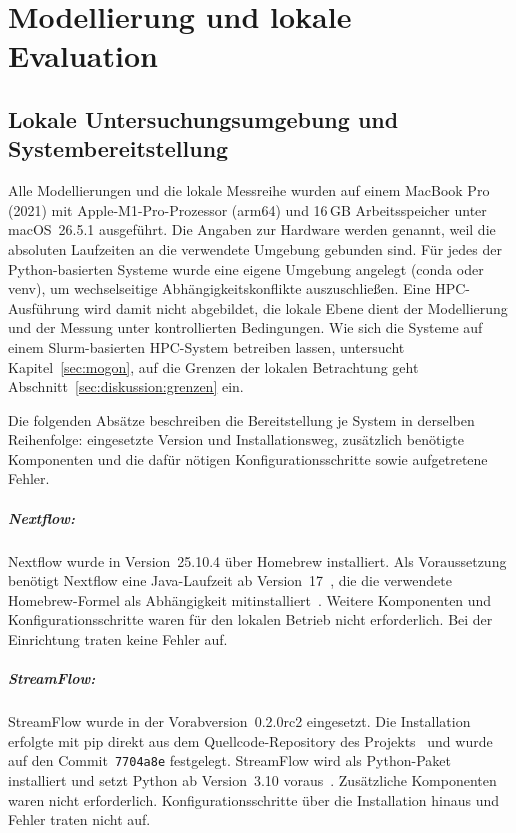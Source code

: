 
\lstset{breaklines=true, breakatwhitespace=false}

\chapter{Modellierung und lokale Evaluation}
\label{sec:lokal}

\section{Lokale Untersuchungsumgebung und Systembereitstellung}
\label{sec:lokal:umgebung}

Alle Modellierungen und die lokale Messreihe wurden auf einem MacBook
Pro (2021) mit Apple-M1-Pro-Prozessor (arm64) und 16\,GB
Arbeitsspeicher unter macOS~26.5.1 ausgeführt. Die Angaben zur Hardware werden genannt, weil die absoluten Laufzeiten an die verwendete Umgebung gebunden sind. Für jedes der Python-basierten Systeme wurde eine eigene Umgebung angelegt (conda oder venv), um wechselseitige Abhängigkeitskonflikte auszuschließen. Eine HPC-Ausführung wird damit nicht abgebildet, die lokale Ebene
dient der Modellierung und der Messung unter kontrollierten
Bedingungen. Wie sich die
Systeme auf einem Slurm-basierten HPC-System betreiben lassen,
untersucht Kapitel~\ref{sec:mogon}, auf die Grenzen der lokalen
Betrachtung geht Abschnitt~\ref{sec:diskussion:grenzen} ein.

Die folgenden Absätze beschreiben die Bereitstellung je System in
derselben Reihenfolge: eingesetzte Version und Installationsweg,
zusätzlich benötigte Komponenten und die dafür nötigen
Konfigurationsschritte sowie aufgetretene Fehler.

\paragraph{Nextflow:} Nextflow wurde in Version~25.10.4 über Homebrew
installiert. Als Voraussetzung benötigt Nextflow eine Java-Laufzeit
ab Version~17~\cite{nextflowdocs-install}, die die verwendete
Homebrew-Formel als Abhängigkeit mitinstalliert~\cite{brewnextflow}.
Weitere Komponenten und Konfigurationsschritte waren für den lokalen
Betrieb nicht erforderlich. Bei der Einrichtung traten keine Fehler
auf.

\paragraph{StreamFlow:} StreamFlow wurde in der Vorabversion~0.2.0rc2
eingesetzt. Die Installation erfolgte mit pip direkt aus dem
Quellcode-Repository des Projekts~\cite{streamflowrepo} und wurde auf
den Commit~\texttt{7704a8e} festgelegt. StreamFlow wird als
Python-Paket installiert und setzt Python ab Version~3.10
voraus~\cite{streamflowdocs}. Zusätzliche Komponenten waren nicht
erforderlich. Konfigurationsschritte über die
Installation hinaus und Fehler traten nicht auf.

